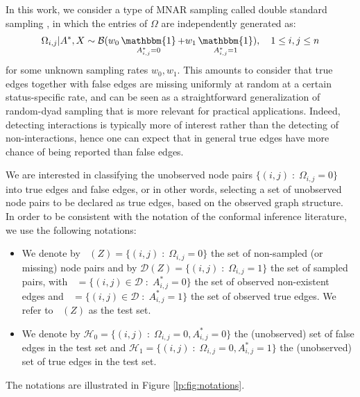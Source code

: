\documentclass[a4paper, 11pt]{article}
\theoremstyle{remark}
\DeclareMathOperator{\ind}{\mathbbm{1}}
\DeclareMathOperator{\Dtest}{\cD_{\text{test}}}
\DeclareMathOperator{\cDNull}{\cD^0}
\DeclareMathOperator{\cDAlt}{\cD^1}
\newcommand{\EM}{\ensuremath}
\newcommand{\cB}{\EM{\mathcal{B}}}
\newcommand{\cD}{\EM{\mathcal{D}}}
\newcommand{\cH}{\EM{\mathcal{H}}}
\begin{document}


In this work, we consider a type of MNAR sampling called double standard sampling \citep{chiquet20, sportisse2020imputation}, in which the entries of $\Omega$ are independently generated as:%
\begin{align*}
\Omega_{i,j} \vert A^*, X \sim \cB( w_0 \ind_{A^*_{i,j} =0} + w_1 \ind_{A^*_{i,j} =1} ), \quad 1 \leq i, j \leq n 
\end{align*}
for some unknown sampling rates $w_0, w_1$. This amounts to consider that true edges together with false edges are missing uniformly at random at a certain status-specific rate, and can be seen as a straightforward generalization of random-dyad sampling that is more relevant for practical applications. Indeed, detecting interactions is typically more of interest rather than the detecting of non-interactions, hence one can expect that in general true edges have more chance of being reported than false edges. 



We are interested in classifying the unobserved node pairs $\{ (i,j) \; \colon \;  \Omega_{i,j} = 0\}$ into true edges and false edges, or in other words, selecting a set of unobserved node pairs to be declared as true edges, based on the observed graph structure. In order to be consistent with the notation of the conformal inference literature, we use the following notations:
\begin{itemize}
\item We denote by $\Dtest(Z)=\{ (i,j) \; \colon \;  \Omega_{i,j} = 0\}$ the set of non-sampled (or missing) node pairs and by $\cD(Z)=\{ (i,j) \; \colon \;  \Omega_{i,j} = 1\}$ the set of sampled pairs, with $\cDNull = \{ (i,j) \in \cD \; \colon \; A^*_{i,j} = 0 \}$ the set of observed non-existent edges and $\cDAlt = \{ (i,j) \in \cD \; \colon \; A^*_{i,j} = 1 \}$ the set of observed true edges. We refer to $\Dtest(Z)$ as the test set.%
\item We denote by $\cH_0 = \{(i,j) \; \colon \; \Omega_{i,j} = 0, A^*_{i,j} = 0 \} $ the (unobserved) set of false edges in the test set and $\cH_1 = \{(i,j) \; \colon \; \Omega_{i,j} = 0, A^*_{i,j} = 1 \}$ the (unobserved) set of true edges in the test set. 
\end{itemize}
The notations are illustrated in Figure \ref{lp:fig:notations}. 
\end{document}

